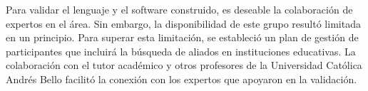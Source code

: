 
Para validar el lenguaje y el software construido, es deseable la colaboración de expertos en el área. Sin embargo, la disponibilidad de este grupo resultó limitada en un principio. Para superar esta limitación, se estableció un plan de gestión de participantes que incluirá la búsqueda de aliados en instituciones educativas. La colaboración con el tutor académico y otros profesores de la Universidad Católica Andrés Bello facilitó la conexión con los expertos que apoyaron en la validación.